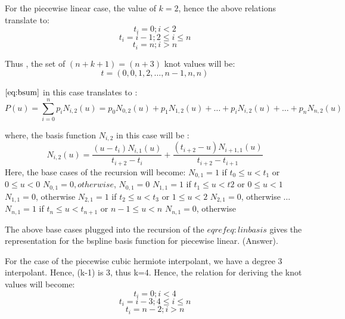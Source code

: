 \documentclass{article}
\begin{document}
For the piecewise linear case, the value of $k=2$, hence the above relations translate to: 
\[ t_i = 0; i < 2\]
\[ t_i = i-1; 2 \leq i \leq n\]
\[ t_i = n; i > n\]

Thus , the set of $(n+k+1) = (n+3)$ knot values will be: \newline
\[ t = (0,0,1,2, \dots, n-1, n,n)\]

$\eqref{eq:bsum}$ in this case translates to : \newline
\[ P(u) = \sum_{i=0}^n p_i N_{i,2}(u) = p_0 N_{0,2}(u) + p_1 N_{1,2}(u) + \dots + p_i N_{i,2}(u) + \dots + p_n N_{n,2}(u) \]

where, the basis function $N_{i,2}$ in this case will be : \newline
\begin{equation}
   N_{i,2}(u) = \dfrac{(u - t_i) N_{i,1}(u)}{t_{i+2} - t_i} + \dfrac{(t_{i+2} - u)N_{i+1,1}(u)}{t_{i+2} - t_{i+1}}
   \label{eq:linbasis}
\end{equation}
Here, the base cases of the recursion will become: \newline
$N_{0,1} = 1 $ if $t_0 \leq u < t_1 $ or $0 \leq u < 0$ \newline
$N_{0,1} = 0, otherwise$, \newline
$N_{0,1} = 0$ \newline \newline
$N_{1,1} = 1$ if $t_1 \leq u < t2$ or $0 \leq u < 1$ \newline
$N_{1,1} = 0$, otherwise \newline \newline
$N_{2,1} = 1$ if $t_2 \leq u < t_3$ or $1 \leq u < 2$ \newline
$N_{2,1} = 0$, otherwise \newline \newline
$\dots$ \newline
$N_{n,1} = 1$ if $t_n \leq u < t_{n+1}$ or $n-1 \leq u < n$  \newline
$N_{n,1} = 0$, otherwise \newline \newline

The above base cases plugged into the recursion of the $eqref{eq:linbasis}$ gives the representation for the bspline basis function for piecewise linear. (Answer). \newline

For the case of the piecewise cubic hermiote interpolant, we have a degree 3 interpolant. Hence, (k-1) is 3, thus k=4. Hence, the relation for deriving the knot values will become: \newline
\[ t_i = 0; i < 4\]
\[ t_i = i-3; 4 \leq i \leq n \]
\[ t_i = n-2; i > n\]
\end{document}
